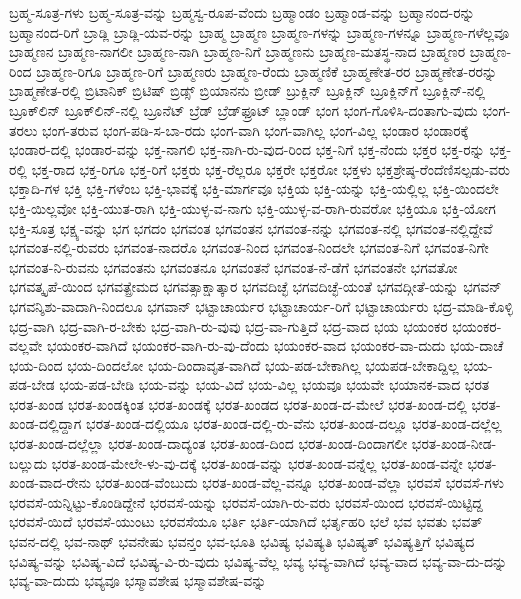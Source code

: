 {ಬ್ರಹ್ಮ-ಸೂತ್ರ-ಗಳು
ಬ್ರಹ್ಮ-ಸೂತ್ರ-ವನ್ನು
ಬ್ರಹ್ಮಸ್ವ-ರೂಪ-ವೆಂದು
ಬ್ರಹ್ಮಾಂಡಂ
ಬ್ರಹ್ಮಾಂಡ-ವನ್ನು
ಬ್ರಹ್ಮಾನಂದ-ರನ್ನು
ಬ್ರಹ್ಮಾನಂದ-ರಿಗೆ
ಬ್ರಾಡ್ಲಿ
ಬ್ರಾಡ್ಲಿ-ಯವ-ರನ್ನು
ಬ್ರಾಹ್ಮ
ಬ್ರಾಹ್ಮಣ
ಬ್ರಾಹ್ಮಣ-ಗಳನ್ನು
ಬ್ರಾಹ್ಮಣ-ಗಳನ್ನೂ
ಬ್ರಾಹ್ಮಣ-ಗಳೆಲ್ಲವೂ
ಬ್ರಾಹ್ಮಣನ
ಬ್ರಾಹ್ಮಣ-ನಾಗಲೀ
ಬ್ರಾಹ್ಮಣ-ನಾಗಿ
ಬ್ರಾಹ್ಮಣ-ನಿಗೆ
ಬ್ರಾಹ್ಮಣನು
ಬ್ರಾಹ್ಮಣ-ಮತಸ್ಥ-ನಾದ
ಬ್ರಾಹ್ಮಣರ
ಬ್ರಾಹ್ಮಣ-ರಿಂದ
ಬ್ರಾಹ್ಮಣ-ರಿಗೂ
ಬ್ರಾಹ್ಮಣ-ರಿಗೆ
ಬ್ರಾಹ್ಮಣರು
ಬ್ರಾಹ್ಮಣ-ರೆಂದು
ಬ್ರಾಹ್ಮಣಿಕೆ
ಬ್ರಾಹ್ಮಣೇತ-ರರ
ಬ್ರಾಹ್ಮಣೇತ-ರರನ್ನು
ಬ್ರಾಹ್ಮಣೇತ-ರಲ್ಲಿ
ಬ್ರಿಟಾನಿಕ್
ಬ್ರಿಟಿಷ್
ಬ್ರಿಡ್ಸ್
ಬ್ರಿಯಾನನು
ಬ್ರೀಡ್
ಬ್ರುಕ್ಲಿನ್
ಬ್ರೂಕ್ಲಿನ್
ಬ್ರೂಕ್ಲಿನ್‌ಗೆ
ಬ್ರೂಕ್ಲಿನ್‌-ನಲ್ಲಿ
ಬ್ರೂಕ್‌ಲಿನ್‌
ಬ್ರೂಕ್‌ಲಿನ್‌-ನಲ್ಲಿ
ಬ್ರೂನೆಟ್
ಬ್ರೆಡ್
ಬ್ರೆಡ್‌ಫ್ರೂಟ್
ಬ್ಲಾಂಡ್
ಭಂಗ
ಭಂಗ-ಗೊಳಿಸಿ-ದಂತಾಗು-ವುದು
ಭಂಗ-ತರಲು
ಭಂಗ-ತರುವ
ಭಂಗ-ಪಡಿ-ಸ-ಬಾ-ರದು
ಭಂಗ-ವಾಗಿ
ಭಂಗ-ವಾಗಿಲ್ಲ
ಭಂಗ-ವಿಲ್ಲ
ಭಂಡಾರ
ಭಂಡಾರಕ್ಕೆ
ಭಂಡಾರ-ದಲ್ಲಿ
ಭಂಡಾರ-ವನ್ನು
ಭಕ್ತ-ನಾಗಲಿ
ಭಕ್ತ-ನಾಗಿ-ರು-ವುದ-ರಿಂದ
ಭಕ್ತ-ನಿಗೆ
ಭಕ್ತ-ನೆಂದು
ಭಕ್ತರ
ಭಕ್ತ-ರನ್ನು
ಭಕ್ತ-ರಲ್ಲಿ
ಭಕ್ತ-ರಾದ
ಭಕ್ತ-ರಿಗೂ
ಭಕ್ತ-ರಿಗೆ
ಭಕ್ತರು
ಭಕ್ತ-ರೆಲ್ಲರೂ
ಭಕ್ತರೇ
ಭಕ್ತರೋ
ಭಕ್ತಳು
ಭಕ್ತಶ್ರೇಷ್ಠ-ರೆಂದೆಣಿಸಲ್ಪಡು-ವರು
ಭಕ್ತಾದಿ-ಗಳ
ಭಕ್ತಿ
ಭಕ್ತಿ-ಗಳೆಂಬ
ಭಕ್ತಿ-ಭಾವಕ್ಕೆ
ಭಕ್ತಿ-ಮಾರ್ಗವೂ
ಭಕ್ತಿಯ
ಭಕ್ತಿ-ಯನ್ನು
ಭಕ್ತಿ-ಯಲ್ಲಿಲ್ಲ
ಭಕ್ತಿ-ಯಿಂದಲೇ
ಭಕ್ತಿ-ಯಿಲ್ಲವೋ
ಭಕ್ತಿ-ಯುತ-ರಾಗಿ
ಭಕ್ತಿ-ಯುಳ್ಳ-ವ-ನಾಗು
ಭಕ್ತಿ-ಯುಳ್ಳ-ವ-ರಾಗಿ-ರುವರೋ
ಭಕ್ತಿಯೂ
ಭಕ್ತಿ-ಯೋಗ
ಭಕ್ತಿ-ಸೂತ್ರ
ಭಕ್ಷ್ಯ-ವನ್ನು
ಭಗ
ಭಗದಂ
ಭಗವಂತ
ಭಗವಂತನ
ಭಗವಂತ-ನನ್ನು
ಭಗವಂತ-ನಲ್ಲಿ
ಭಗವಂತ-ನಲ್ಲಿದ್ದೇವೆ
ಭಗವಂತ-ನಲ್ಲಿ-ರುವರು
ಭಗವಂತ-ನಾದರೊ
ಭಗವಂತ-ನಿಂದ
ಭಗವಂತ-ನಿಂದಲೇ
ಭಗವಂತ-ನಿಗೆ
ಭಗವಂತ-ನಿಗೇ
ಭಗವಂತ-ನಿ-ರುವನು
ಭಗವಂತನು
ಭಗವಂತನೂ
ಭಗವಂತನೆ
ಭಗವಂತ-ನೆ-ಡೆಗೆ
ಭಗವಂತನೇ
ಭಗವತೋ
ಭಗವತ್ಕೃಪೆ-ಯಿಂದ
ಭಗವತ್ಪ್ರೇಮದ
ಭಗವತ್ಸಾಕ್ಷಾತ್ಕಾರ
ಭಗವದಿಚ್ಛೆ
ಭಗವದಿಚ್ಛೆ-ಯಂತೆ
ಭಗವದ್ಗೀತೆ-ಯನ್ನು
ಭಗವನ್
ಭಗವನ್ಶಿಶು-ವಾದಾಗಿ-ನಿಂದಲೂ
ಭಗವಾನ್
ಭಟ್ಟಾಚಾರ್ಯರ
ಭಟ್ಟಾಚಾರ್ಯ-ರಿಗೆ
ಭಟ್ಟಾಚಾರ್ಯರು
ಭದ್ರ-ಮಾಡಿ-ಕೊಳ್ಳಿ
ಭದ್ರ-ವಾಗಿ
ಭದ್ರ-ವಾಗಿ-ರ-ಬೇಕು
ಭದ್ರ-ವಾಗಿ-ರು-ವುವು
ಭದ್ರ-ವಾ-ಗುತ್ತಿದೆ
ಭದ್ರ-ವಾದ
ಭಯ
ಭಯಂಕರ
ಭಯಂಕರ-ವಲ್ಲವೇ
ಭಯಂಕರ-ವಾಗಿದೆ
ಭಯಂಕರ-ವಾಗಿ-ರು-ವು-ದೆಂದು
ಭಯಂಕರ-ವಾದ
ಭಯಂಕರ-ವಾ-ದುದು
ಭಯ-ದಾಚೆ
ಭಯ-ದಿಂದ
ಭಯ-ದಿಂದಲೋ
ಭಯ-ದಿಂದಾವೃತ-ವಾಗಿದೆ
ಭಯ-ಪಡ-ಬೇಕಾಗಿಲ್ಲ
ಭಯಪಡ-ಬೇಕಾದ್ದಿಲ್ಲ
ಭಯ-ಪಡ-ಬೇಡ
ಭಯ-ಪಡ-ಬೇಡಿ
ಭಯ-ವನ್ನು
ಭಯ-ವಿದೆ
ಭಯ-ವಿಲ್ಲ
ಭಯವೂ
ಭಯವೇ
ಭಯಾನಕ-ವಾದ
ಭರತ
ಭರತ-ಖಂಡ
ಭರತ-ಖಂಡಕ್ಕಿಂತ
ಭರತ-ಖಂಡಕ್ಕೆ
ಭರತ-ಖಂಡದ
ಭರತ-ಖಂಡ-ದ-ಮೇಲೆ
ಭರತ-ಖಂಡ-ದಲ್ಲಿ
ಭರತ-ಖಂಡ-ದಲ್ಲಿದ್ದಾಗ
ಭರತ-ಖಂಡ-ದಲ್ಲಿಯೂ
ಭರತ-ಖಂಡ-ದಲ್ಲಿ-ರು-ವೆನು
ಭರತ-ಖಂಡ-ದಲ್ಲೂ
ಭರತ-ಖಂಡ-ದಲ್ಲೆಲ್ಲ
ಭರತ-ಖಂಡ-ದಲ್ಲೆಲ್ಲಾ
ಭರತ-ಖಂಡ-ದಾದ್ಯಂತ
ಭರತ-ಖಂಡ-ದಿಂದ
ಭರತ-ಖಂಡ-ದಿಂದಾಗಲೀ
ಭರತ-ಖಂಡ-ನೀಡ-ಬಲ್ಲುದು
ಭರತ-ಖಂಡ-ಮೇಲೇ-ಳು-ವು-ದಕ್ಕೆ
ಭರತ-ಖಂಡ-ವನ್ನು
ಭರತ-ಖಂಡ-ವನ್ನೆಲ್ಲ
ಭರತ-ಖಂಡ-ವನ್ನೇ
ಭರತ-ಖಂಡ-ವಾದ-ರೇನು
ಭರತ-ಖಂಡ-ವೆಂಬುದು
ಭರತ-ಖಂಡ-ವೆಲ್ಲ-ವನ್ನೂ
ಭರತ-ಖಂಡ-ವೆಲ್ಲಾ
ಭರವಸೆ
ಭರವಸೆ-ಗಳು
ಭರವಸೆ-ಯನ್ನಿಟ್ಟು-ಕೊಂಡಿದ್ದೇನೆ
ಭರವಸೆ-ಯನ್ನು
ಭರವಸೆ-ಯಾಗಿ-ರು-ವರು
ಭರವಸೆ-ಯಿಂದ
ಭರವಸೆ-ಯಿಟ್ಟಿದ್ದ
ಭರವಸೆ-ಯಿದೆ
ಭರವಸೆ-ಯುಂಟು
ಭರವಸೆಯೂ
ಭರ್ತಿ
ಭರ್ತಿ-ಯಾಗಿದೆ
ಭರ್ತೃಹರಿ
ಭಲೆ
ಭವ
ಭವತು
ಭವತ್
ಭವನ-ದಲ್ಲಿ
ಭವ-ನಾಥ್
ಭವನೇಷು
ಭವನ್ತಂ
ಭವ-ಭೂತಿ
ಭವಿಷ್ಯ
ಭವಿಷ್ಯತಿ
ಭವಿಷ್ಯತ್
ಭವಿಷ್ಯತ್ತಿಗೆ
ಭವಿಷ್ಯದ
ಭವಿಷ್ಯ-ವನ್ನು
ಭವಿಷ್ಯ-ವಿದೆ
ಭವಿಷ್ಯ-ವಿ-ರು-ವುದು
ಭವಿಷ್ಯ-ವೆಲ್ಲ
ಭವ್ಯ
ಭವ್ಯ-ವಾಗಿದೆ
ಭವ್ಯ-ವಾದ
ಭವ್ಯ-ವಾ-ದು-ದನ್ನು
ಭವ್ಯ-ವಾ-ದುದು
ಭವ್ಯವೂ
ಭಸ್ಮಾವಶೇಷ
ಭಸ್ಮಾವಶೇಷ-ವನ್ನು
}
